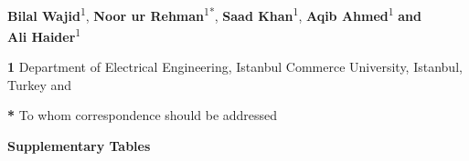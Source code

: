 \documentclass[10pt,letterpaper]{article}
\begin{document}
\vspace*{0.2in}

\begin{flushleft}
{\Huge
\textbf{} %
}
\newline
\bigskip
\\
\large \textbf{Bilal Wajid}\textsuperscript{1}, \textbf{Noor ur Rehman}\textsuperscript{1*}, \textbf{Saad Khan}\textsuperscript{1}, \textbf{Aqib Ahmed}\textsuperscript{1} \textbf{and} \\ \textbf{Ali Haider}\textsuperscript{1}
\\
\bigskip
\begin{small}
\textbf{1} Department of Electrical Engineering, Istanbul Commerce University, Istanbul, Turkey and
\\
\end{small}
\medskip
\begin{small}
\textbf{*} To whom correspondence should be addressed
\\
\end{small}
\medskip
\bigskip
\textbf{{\LARGE Supplementary Tables}}
\bigskip
% 
%





\end{flushleft}
\end{document}
